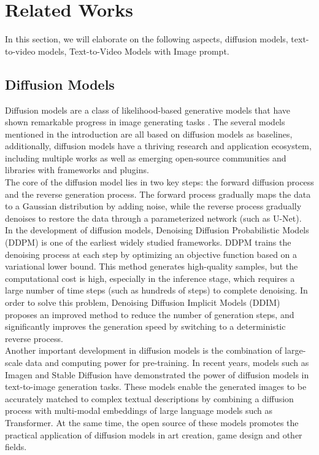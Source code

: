 \section{Related Works}
\label{sec:Related Works}
In this section, we will elaborate on the following aspects, diffusion models, text-to-video models, Text-to-Video Models with Image prompt.

\subsection{Diffusion Models}
Diffusion models are a class of likelihood-based generative models that have shown remarkable progress in image generating tasks \cite{rombach2022high,ruiz2023dreambooth}. The several models mentioned in the introduction are all based on diffusion models as baselines, additionally, diffusion models have a thriving research and application ecosystem, including multiple works \cite{mou2024t2i} as well as emerging open-source communities and libraries \cite{wang2023zero} with frameworks and plugins.\\
\indent The core of the diffusion model lies in two key steps: the forward diffusion process and the reverse generation process. The forward process gradually maps the data to a Gaussian distribution by adding noise, while the reverse process gradually denoises to restore the data through a parameterized network (such as U-Net).\\
\indent In the development of diffusion models, Denoising Diffusion Probabilistic Models (DDPM) is one of the earliest widely studied frameworks. DDPM trains the denoising process at each step by optimizing an objective function based on a variational lower bound. This method generates high-quality samples, but the computational cost is high, especially in the inference stage, which requires a large number of time steps (such as hundreds of steps) to complete denoising. In order to solve this problem, Denoising Diffusion Implicit Models (DDIM) proposes an improved method to reduce the number of generation steps, and significantly improves the generation speed by switching to a deterministic reverse process.\\
\indent Another important development in diffusion models is the combination of large-scale data and computing power for pre-training. In recent years, models such as Imagen and Stable Diffusion have demonstrated the power of diffusion models in text-to-image generation tasks. These models enable the generated images to be accurately matched to complex textual descriptions by combining a diffusion process with multi-modal embeddings of large language models such as Transformer. At the same time, the open source of these models promotes the practical application of diffusion models in art creation, game design and other fields.\\
